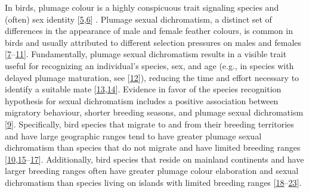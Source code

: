 \documentclass[
  a4paper,
]{article}
\begin{document}
In birds, plumage colour is a highly conspicuous trait signaling species
and (often) sex identity
{[}\protect\hyperlink{ref-martin2015a}{5},\protect\hyperlink{ref-bitton2016}{6}{]}
. Plumage sexual dichromatism, a distinct set of differences in the
appearance of male and female feather colours, is common in birds and
usually attributed to different selection pressures on males and females
{[}\protect\hyperlink{ref-martin1996}{7}--\protect\hyperlink{ref-dunn2015}{11}{]}.
Fundamentally, plumage sexual dichromatism results in a visible trait
useful for recognizing an individual's species, sex, and age (e.g., in
species with delayed plumage maturation, see
{[}\protect\hyperlink{ref-hawkins2012}{12}{]}), reducing the time and
effort necessary to identify a suitable mate
{[}\protect\hyperlink{ref-hamilton1961}{13},\protect\hyperlink{ref-saetre1992}{14}{]}.
Evidence in favor of the species recognition hypothesis for sexual
dichromatism includes a positive association between migratory
behaviour, shorter breeding seasons, and plumage sexual dichromatism
{[}\protect\hyperlink{ref-badyaev2003}{9}{]}. Specifically, bird species
that migrate to and from their breeding territories and have large
geographic ranges tend to have greater plumage sexual dichromatism than
species that do not migrate and have limited breeding ranges
{[}\protect\hyperlink{ref-dale2015}{10},\protect\hyperlink{ref-friedman2009}{15}--\protect\hyperlink{ref-matysiokova2017}{17}{]}.
Additionally, bird species that reside on mainland continents and have
larger breeding ranges often have greater plumage colour elaboration and
sexual dichromatism than species living on islands with limited breeding
ranges
{[}\protect\hyperlink{ref-badyaev1998}{18}--\protect\hyperlink{ref-kearns2020}{23}{]}.
\end{document}

